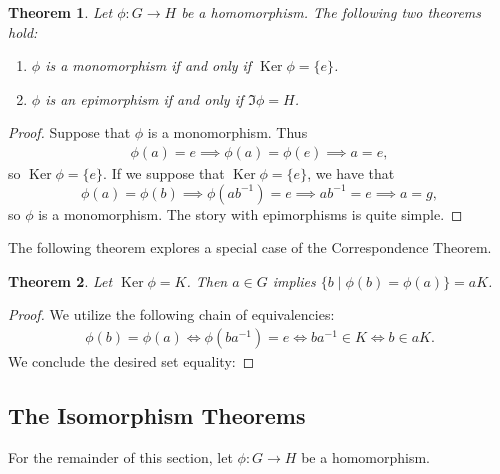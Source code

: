 \documentclass[11pt]{article}
\newtheorem{theorem}{Theorem}
\newcommand{\Ker}{\operatorname{Ker}}
\begin{document}
\begin{adjustwidth}{0.5cm}{}
  \begin{theorem}
    Let $\phi : G \to H$ be a homomorphism. The following two theorems hold:
    \begin{enumerate}
      \item $\phi$ is a monomorphism if and only if $\Ker \phi = \{ e \}$.
      \item $\phi$ is an epimorphism if and only if $\Im \phi = H$.
    \end{enumerate}
  \end{theorem}
  \begin{proof}
    Suppose that $\phi$ is a monomorphism. Thus
    \begin{align*}
      \phi(a) = e \implies \phi(a) = \phi(e) \implies a = e,
    \end{align*}
    so $\Ker \phi = \{ e \}$. If we suppose that $\Ker \phi = \{ e \}$, we have that
    \[
      \phi(a) = \phi(b) \implies \phi(ab^{-1}) = e \implies ab^{-1} = e \implies a = g,
    \]
    so $\phi$ is a monomorphism. The story with epimorphisms is quite simple.
  \end{proof}
\end{adjustwidth}

The following theorem explores a special case of the Correspondence Theorem.


\begin{adjustwidth}{0.5cm}{}
  \begin{theorem}
    Let $\Ker \phi = K$. Then $a \in G$ implies $\{ b \mid \phi(b) = \phi(a) \} = aK$.
  \end{theorem}
  \begin{proof}
    We utilize the following chain of equivalencies:
    \begin{align*}
      \phi(b) = \phi(a) \iff \phi(ba^{-1}) = e \iff b a^{-1} \in K \iff b \in aK.
    \end{align*}
    We conclude the desired set equality:
  \end{proof}
\end{adjustwidth}


\subsection{The Isomorphism Theorems}

For the remainder of this section, let $\phi : G \to H$ be a homomorphism.
\end{document}
